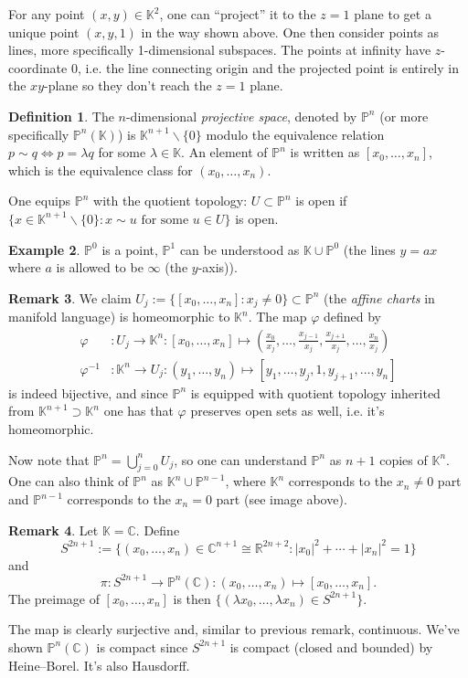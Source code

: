 \documentclass{article}
\newcommand{\R}{\mathbb{R}}
\newcommand{\C}{\mathbb{C}}
\newcommand{\K}{\mathbb{K}}
\newcommand{\p}{\mathbb{P}}
\theoremstyle{definition}
\newtheorem{defn}{Definition}[subsection]
\newtheorem{example}[defn]{Example}
\newtheorem{remark}[defn]{Remark}
\begin{document}
For any point $(x,y)\in\K^2$, one can ``project'' it to the $z=1$ plane to get a unique point $(x,y,1)$ in the way shown above. One then consider points as lines, more specifically 1-dimensional subspaces. The points at infinity have $z$-coordinate 0, i.e. the line connecting origin and the projected point is entirely in the $xy$-plane so they don't reach the $z=1$ plane.

\begin{defn}
The $n$-dimensional \textit{projective space}, denoted by $\p^n$ (or more specifically $\p^n(\K)$) is $\K^{n+1}\backslash\{0\}$ modulo the equivalence relation $p\sim q\iff p=\lambda q$ for some $\lambda\in\K$. An element of $\p^n$ is written as $[x_0,\ldots,x_n]$, which is the equivalence class for $(x_0,\ldots,x_n)$.

One equips $\p^n$ with the quotient topology: $U\subset\p^n$ is open if $\{x\in\K^{n+1}\backslash\{0\}:x\sim u\text{ for some }u\in U\}$ is open.
\end{defn}
\begin{example}
\label{example:understandPn}
$\p^0$ is a point, $\p^1$ can be understood as $\K\cup\p^0$ (the lines $y=ax$ where $a$ is allowed to be $\infty$ (the $y$-axis)).
\end{example}

\begin{remark}
\label{remark:charts}
We claim $U_j:=\{[x_0,\ldots,x_n]:x_j\neq 0\}\subset\p^n$ (the \textit{affine charts} in manifold language) is homeomorphic to $\K^n$. The map $\varphi$ defined by
\[
\begin{aligned}
\varphi&:U_j\rightarrow\K^n:[x_0,\ldots,x_n]\mapsto\left(\frac{x_0}{x_j},\ldots,\frac{x_{j-1}}{x_j},\frac{x_{j+1}}{x_j},\ldots,\frac{x_n}{x_j}\right) \\
\varphi^{-1}&:\K^n\rightarrow U_j:(y_1,\ldots,y_n)\mapsto [y_1,\ldots,y_j,1,y_{j+1},\ldots,y_n]
\end{aligned}
\]
is indeed bijective, and since $\p^n$ is equipped with quotient topology inherited from $\K^{n+1}\supset\K^n$ one has that $\varphi$ preserves open sets as well, i.e. it's homeomorphic.

Now note that $\p^n=\bigcup_{j=0}^n U_j$, so one can understand $\p^n$ as $n+1$ copies of $\K^n$. One can also think of $\p^n$ as $\K^n\cup\p^{n-1}$, where $\K^n$ corresponds to the $x_n\neq 0$ part and $\p^{n-1}$ corresponds to the $x_n=0$ part (see image above).
\end{remark}

\begin{remark}
\label{remark:PnCiscompact}
Let $\K=\C$. Define
\[
S^{2n+1}:=\{(x_0,\ldots,x_n)\in\C^{n+1}\cong\R^{2n+2}:|x_0|^2+\cdots+|x_n|^2=1\}
\]
and
\[
\pi:S^{2n+1}\rightarrow\p^n(\C):(x_0,\ldots,x_n)\mapsto [x_0,\ldots,x_n].
\]
The preimage of $[x_0,\ldots,x_n]$ is then $\{(\lambda x_0,\ldots,\lambda x_n) \in S^{2n+1}\}$.

The map is clearly surjective and, similar to previous remark, continuous. We've shown $\p^n(\C)$ is compact since $S^{2n+1}$ is compact (closed and bounded) by Heine--Borel. It's also Hausdorff.
\end{remark}
\end{document}
